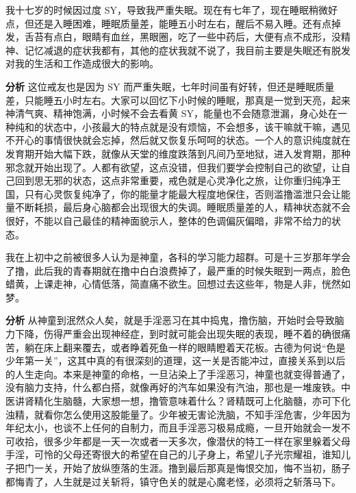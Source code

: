 \begin{case}
    我十七岁的时候因过度 SY，导致我严重失眠。现在有七年了，现在睡眠稍微好点，但还是入睡困难，睡眠质量差，能睡五小时左右，醒后不易入睡。还有点掉发，舌苔有点白，眼睛有血丝，黑眼圈，吃了一些中药后，大便有点不成形，没精神、记忆减退的症状我都有，其他的症状我就不说了，我目前主要是失眠还有脱发对我的生活和工作造成很大的影响。

    \textbf{分析} 这位戒友也是因为 SY 而严重失眠，七年时间虽有好转，但还是睡眠质量差，只能睡五小时左右。大家可以回忆下小时候的睡眠，那真是一觉到天亮，起来神清气爽、精神饱满，小时候不会去看黄 SY，能量也不会随意泄漏，身心处在一种纯和的状态中，小孩最大的特点就是没有烦恼，不会想多，该干嘛就干嘛，遇见不开心的事情很快就会忘掉，然后就又恢复乐呵呵的状态。一个人的意识纯度就在发育期开始大幅下跌，就像从天堂的维度跌落到凡间乃至地狱，进入发育期，那种邪念就开始出现了。人都有欲望，这点没错，但我们要学会控制自己的欲望，让自己回到思无邪的状态，这点非常重要，戒色就是心灵净化之旅，让你重归纯净王国，只有心灵恢复纯净了，你的能量才能最大程度地保住，否则滥撸滥泄只会让能量不断耗损，最后身心脑都会出现很大的失调。睡眠质量差的人，精神状态就不会很好，不能以自己最佳的精神面貌示人，整体的色调偏灰偏暗，非常不给力的状态。
\end{case}

\begin{case}
    我在上初中之前被很多人认为是神童，各科的学习能力超群。可是十三岁那年学会了撸，此后我的青春期就在撸中白白浪费掉了，最严重的时候失眠到一两点，脸色蜡黄，上课走神，心情低落，简直痛不欲生。回想过去这些年，物是人非，恍然如梦。

    \textbf{分析} 从神童到泯然众人矣，就是手淫恶习在其中捣鬼，撸伤脑，开始时会导致脑力下降，伤得严重会出现神经症，到时就可能会出现失眠的表现，睡不着的确很痛苦，躺在床上翻来覆去，或者睁着死鱼一样的眼睛瞪着天花板。古德为何说“色是少年第一关”，这其中真的有很深刻的道理，这一关是否能冲过，直接关系到以后的人生走向。本来是神童的命格，一旦沾染上了手淫恶习，神童也就变得普通了，没有脑力支持，什么都白搭，就像再好的汽车如果没有汽油，那也是一堆废铁。中医讲肾精化生脑髓，大家想一想，撸管意味着什么？肾精既可上化脑髓，亦可下化浊精，就看你怎么使用这股能量了。少年被无害论洗脑，不知手淫危害，少年因为年纪太小，也谈不上任何的自制力，而且手淫恶习极易成瘾，一旦开始就会一发不可收拾，很多少年都是一天一次或者一天多次，像潜伏的特工一样在家里躲着父母手淫，可怜的父母还寄很大的希望在自己的儿子身上，希望儿子光宗耀祖，谁知儿子把门一关，开始了放纵堕落的生涯。撸到最后那真是悔恨交加，悔不当初，肠子都悔青了，人生就是过关斩将，镇守色关的就是心魔老怪，必须将之斩落马下。
\end{case}

